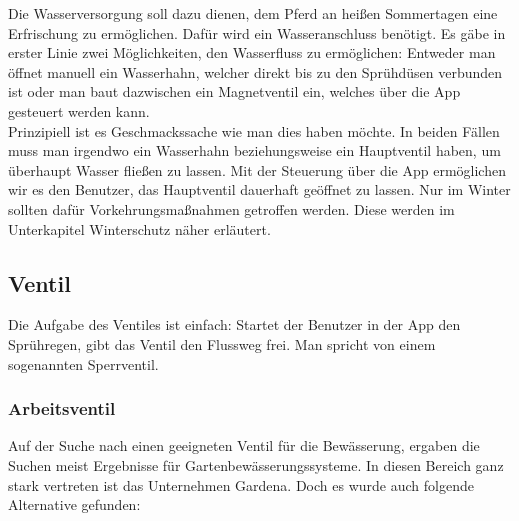Die Wasserversorgung soll dazu dienen, dem Pferd an heißen Sommertagen eine Erfrischung zu ermöglichen. Dafür wird ein Wasseranschluss benötigt. Es gäbe in erster Linie zwei Möglichkeiten, den Wasserfluss zu ermöglichen: Entweder man öffnet manuell ein Wasserhahn, welcher direkt bis zu den Sprühdüsen verbunden ist oder man baut dazwischen ein Magnetventil ein, welches über die App gesteuert werden kann. \\
Prinzipiell ist es Geschmackssache wie man dies haben möchte. In beiden Fällen muss man irgendwo ein Wasserhahn beziehungsweise ein Hauptventil haben, um überhaupt Wasser fließen zu lassen. 
Mit der Steuerung über die App ermöglichen wir es den Benutzer, das Hauptventil dauerhaft geöffnet zu lassen. Nur im Winter sollten dafür Vorkehrungsmaßnahmen getroffen werden. Diese werden im Unterkapitel Winterschutz näher erläutert.  

\subsection{Ventil}
\label{sec:ventil}

Die Aufgabe des Ventiles ist einfach: Startet der Benutzer in der App den Sprühregen, gibt das Ventil den Flussweg frei. Man spricht von einem sogenannten Sperrventil. 

\subsubsection{Arbeitsventil}
\label{sec:ventilSuche}

Auf der Suche nach einen geeigneten Ventil für die Bewässerung, ergaben die Suchen meist Ergebnisse für Gartenbewässerungssysteme. In diesen Bereich ganz stark vertreten ist das Unternehmen Gardena. Doch es wurde auch folgende Alternative gefunden:

